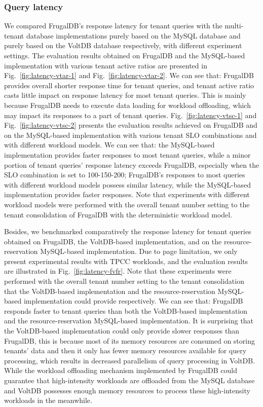 \subsubsection{Query latency}

We compared FrugalDB's response latency for tenant queries with the multi-tenant database implementations purely based on the MySQL database and purely based on the VoltDB database respectively, with different experiment settings. The evaluation results obtained on FrugalDB and the MySQL-based implementation with various tenant active ratios are presented in Fig.~\ref{fig:latency-vtar-1} and Fig.~\ref{fig:latency-vtar-2}. We can see that: FrugalDB provides overall shorter response time for tenant queries, and tenant active ratio casts little impact on response latency for most tenant queries. This is mainly because FrugalDB needs to execute data loading for workload offloading, which may impact its responses to a part of tenant queries. Fig.~\ref{fig:latency-vtsc-1} and Fig.~\ref{fig:latency-vtsc-2} presents the evaluation results achieved on FrugalDB and on the MySQL-based implementation with various tenant SLO combinations and with different workload models. We can see that: the MySQL-based implementation provides faster responses to most tenant queries, while a minor portion of tenant queries' response latency exceeds FrugalDB, especially when the SLO combination is set to 100-150-200; FrugalDB's responses to most queries with different workload models possess similar latency, while the MySQL-based implementation provides faster responses. Note that experiments with different workload models were performed with the overall tenant number setting to the tenant consolidation of FrugalDB with the deterministic workload model.

Besides, we benchmarked comparatively the response latency for tenant queries obtained on FrugalDB, the VoltDB-based implementation, and on the resource-reservation MySQL-based implementation. Due to page limitation, we only present experimental results with TPCC workloads, and the evaluation results are illustrated in Fig.~\ref{fig:latency-fvfr}. Note that these experiments were performed with the overall tenant number setting to the tenant consolidation that the VoltDB-based implementation and the resource-reservation MySQL-based implementation could provide respectively. We can see that: FrugalDB responds faster to tenant queries than both the VoltDB-based implementation and the resource-reservation MySQL-based implementation. It is surprising that the VoltDB-based implementation could only provide slower responses than FrugalDB, this is because most of its memory resources are consumed on storing tenants' data and then it only has fewer memory resources available for query processing, which results in decreased parallelism of query processing in VoltDB. While the workload offloading mechanism implemented by FrugalDB could guarantee that high-intensity workloads are offloaded from the MySQL database and VoltDB possesses enough memory resources to process these high-intensity workloads in the meanwhile.

